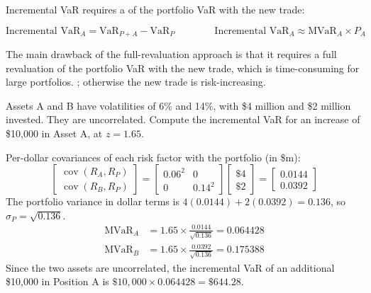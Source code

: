 Incremental VaR requires a  of the portfolio VaR with the
new trade:

\begin{imfmlbox}
\[ \text{Incremental VaR}_A = \text{VaR}_{P+A} - \text{VaR}_P
   \qquad\qquad
   \text{Incremental VaR}_A \approx \text{MVaR}_A \times P_A \]
\end{imfmlbox}

The main drawback of the full-revaluation approach is that it requires a full
revaluation of the portfolio VaR with the new trade, which is time-consuming for
large portfolios. ; otherwise the new trade is risk-increasing.

\begin{imexbox}[title={Incremental VaR on an uncorrelated pair}]
Assets A and B have volatilities of 6\% and 14\%, with \$4 million and \$2 million
invested. They are uncorrelated. Compute the incremental VaR for an increase of
\$10,000 in Asset A, at $z = 1.65$.

Per-dollar covariances of each risk factor with the portfolio (in \$m):
\[
\begin{bmatrix}\operatorname{cov}(R_A,R_P)\\ \operatorname{cov}(R_B,R_P)\end{bmatrix}
=\begin{bmatrix}0.06^2 & 0\\ 0 & 0.14^2\end{bmatrix}
 \begin{bmatrix}\$4\\ \$2\end{bmatrix}
=\begin{bmatrix}0.0144\\ 0.0392\end{bmatrix}
\]
The portfolio variance in dollar terms is
$4(0.0144) + 2(0.0392) = 0.136$, so $\sigma_P = \sqrt{0.136}$.
\begin{align*}
\text{MVaR}_A &= 1.65 \times \frac{0.0144}{\sqrt{0.136}} = 0.064428 \\
\text{MVaR}_B &= 1.65 \times \frac{0.0392}{\sqrt{0.136}} = 0.175388
\end{align*}
Since the two assets are uncorrelated, the incremental VaR of an additional
\$10,000 in Position A is $\$10{,}000 \times 0.064428 = \mathbf{\$644.28}$.
\end{imexbox}

